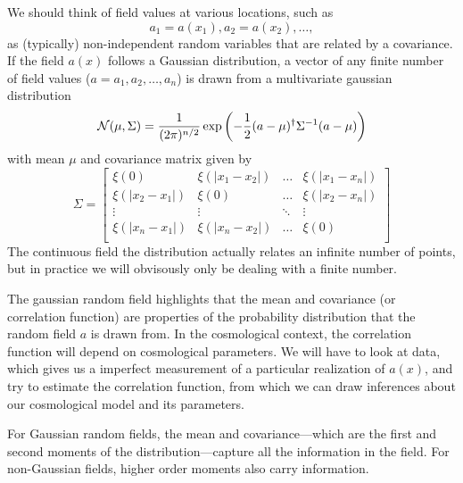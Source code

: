 We should think of field values at various locations, such as 
\begin{equation}a_1 = a(x_1), a_2 = a(x_2), \dots, \end{equation}
as (typically) non-independent random variables that are related by a covariance.  If the field $a(x)$ follows a Gaussian distribution, a vector of any finite number of field values ($a = a_1,a_2,\dots,a_n$) is drawn from a multivariate gaussian distribution
\begin{equation}
  {\cal N}(\mu, \Sigma) = \frac{1}{(2\pi)^{n/2}} \exp \left( -\frac{1}{2} (a - \mu)^\dag \Sigma^{-1} (a-\mu) \right)
\end{equation}
with mean $\mu$ and covariance matrix given by
\begin{equation}
  \Sigma = \left[ \begin{array}{cccc}
    \xi(0) & \xi(|x_1-x_2|) & \dots & \xi(|x_1-x_n|) \\
    \xi(|x_2-x_1|) & \xi(0) & \dots & \xi(|x_2-x_n|) \\
    \vdots & \vdots & \ddots & \vdots \\
    \xi(|x_n-x_1|) & \xi(|x_n-x_2|) & \dots & \xi(0) \\    
    \end{array} \right]
\end{equation}
The continuous field the distribution actually relates an infinite number of points, but in practice we will obvisously only be dealing with a finite number.

The gaussian random field highlights that the mean and covariance (or correlation function) are properties of the probability distribution that the random field $a$ is drawn from.  In the cosmological context, the correlation function will depend on cosmological parameters.  We will have to look at data, which gives us a imperfect measurement of a particular realization of $a(x)$, and try to estimate the correlation function, from which we can draw inferences about our cosmological model and its parameters.

For Gaussian random fields, the mean and covariance---which are the first and second moments of the distribution---capture all the information in the field.  For non-Gaussian fields, higher order moments also carry information.

